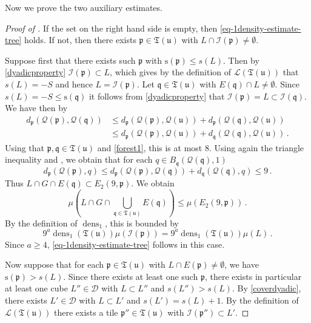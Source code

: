 \documentclass[10pt,a4paper]{article}
\theoremstyle{plain}
\theoremstyle{definition}
\numberwithin{equation}{subsection}
\DeclareMathOperator{\dens}{\operatorname{dens}}
\newcommand{\fp}{{\mathfrak p}}
\newcommand{\fu}{{\mathfrak u}}
\newcommand{\fq}{{\mathfrak q}}
\newcommand{\fT}{{\mathfrak T}}
\newcommand{\ps}{{\mathrm{s}}}
\newcommand{\scI}{{\mathcal{I}}} %
\newcommand{\fcc}{{\mathcal{Q}}}
\newcommand{\proves}[1]{}
\newcommand{\leanok}{}
\begin{document}
Now we prove the two auxiliary estimates.

\begin{proof}[Proof of ]
    \leanok
    \proves{local-dens1-tree-bound}
    If the set on the right hand side is empty, then \eqref{eq-1density-estimate-tree} holds. If not, then there exists $\fp \in \fT(\fu)$ with $L \cap \scI(\fp) \ne \emptyset$.

    Suppose first that there exists such $\fp$ with $\ps(\fp) \le s(L)$. Then by \eqref{dyadicproperty} $\scI(\fp) \subset L$, which gives by the definition of $\mathcal{L}(\fT(\fu))$ that $s(L) = -S$ and hence $L = \scI(\fp)$. Let $\fq \in \fT(\fu)$ with $E(\fq) \cap L \ne \emptyset$. Since $s(L) = -S \le \ps(\fq)$ it follows from \eqref{dyadicproperty} that $\scI(\fp) = L \subset \scI(\fq)$. We have then by 
    \begin{align*}
        d_{\fp}(\fcc(\fp), \fcc(\fq)) &\le d_{\fp}(\fcc(\fp), \fcc(\fu)) + d_{\fp}(\fcc(\fq), \fcc(\fu))\\
        &\le d_{\fp}(\fcc(\fp), \fcc(\fu)) + d_{\fq}(\fcc(\fq), \fcc(\fu))\,.
    \end{align*}
    Using that $\fp, \fq \in \fT(\fu)$ and \eqref{forest1}, this is at most $8$. Using again the triangle inequality and , we obtain that for each $q \in B_{\fq}(\fcc(\fq), 1)$
    $$
        d_{\fp}(\fcc(\fp), q) \le d_{\fp}(\fcc(\fp), \fcc(\fq)) + d_{\fq}(\fcc(\fq), q) \le 9\,.
    $$
    Thus $L \cap G \cap E(\fq) \subset E_2(9, \fp)$. We obtain
    $$
        \mu(L \cap G \cap \bigcup_{\fq \in \fT(\fu)} E(\fq)) \le \mu(E_2(9, \fp))\,.
    $$
    By the definition of $\dens_1$, this is bounded by
    $$
        9^a \dens_1(\fT(\fu)) \mu(\scI(\fp)) =9^a \dens_1(\fT(\fu)) \mu(L)\,.
    $$
    Since $a \ge 4$, \eqref{eq-1density-estimate-tree} follows in this case.

    Now suppose that for each $\fp \in \fT(\fu)$ with $L \cap E(\fp) \ne \emptyset$, we have $\ps(\fp) > s(L)$.
    Since there exists at least one such $\fp$, there exists in particular at least one cube $L'' \in \mathcal{D}$ with $L \subset L''$ and $s(L'') > s(L)$.
    By \eqref{coverdyadic}, there exists $L' \in \mathcal{D}$ with $L \subset L'$ and $s(L') = s(L) + 1$.
    By the definition of $\mathcal{L}(\fT(\fu))$ there exists a tile $\fp'' \in \fT(\fu)$ with $\scI(\fp'') \subset L'$.


\end{proof}
\end{document}
